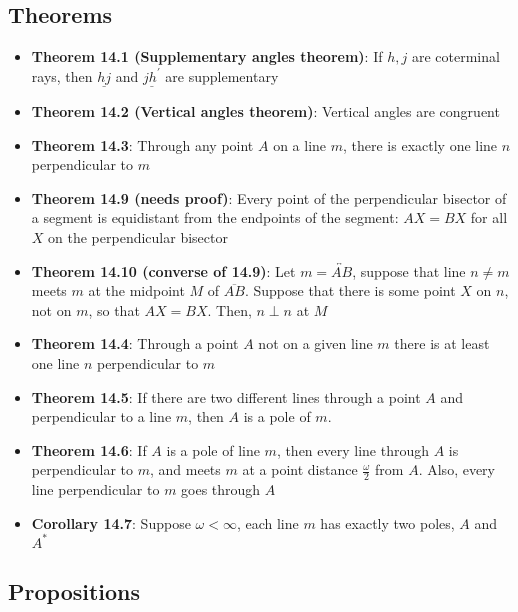 \documentclass{report}
\begin{document}
    \pagebreak 
    \subsection{Theorems}
    \begin{itemize}
        \item \textbf{Theorem 14.1 (Supplementary angles theorem)}: If $h,j$ are coterminal rays, then $\underline{hj}$ and $\underline{jh^{\prime}} $ are supplementary
        \item \textbf{Theorem 14.2 (Vertical angles theorem)}: Vertical angles are congruent
        \item \textbf{Theorem 14.3}: Through any point $A$ on a line $m$, there is exactly one line $n$ perpendicular to $m$
        \item \textbf{Theorem 14.9 (needs proof)}: Every point of the perpendicular bisector of a segment is equidistant from the endpoints of the segment: $AX = BX$ for all $X$ on the perpendicular bisector
        \item \textbf{Theorem 14.10 (converse of 14.9)}: Let $m = \overleftrightarrow{AB}$, suppose that line $n\ne m$ meets $m$ at the midpoint $M$ of $\overline{AB}$. Suppose that there is some point $X$ on $n$, not on $m$, so that $AX = BX$. Then, $n \perp n$ at $M$
        \item \textbf{Theorem 14.4}: Through a point $A$ not on a given line $m$ there is at least one line $n$ perpendicular to $m$
        \item \textbf{Theorem 14.5}: If there are two different lines through a point $A$ and perpendicular to a line $m$, then $A$ is a pole of $m$.
        \item \textbf{Theorem 14.6}: If $A$ is a pole of line $m$, then every line through $A$ is perpendicular to $m$, and meets $m$ at a point distance $\frac{\omega}{2} $ from $A$. Also, every line perpendicular to $m$ goes through $A$
        \item \textbf{Corollary 14.7}: Suppose $\omega < \infty$, each line $m$ has exactly two poles, $A$ and $A^{*}$
    \end{itemize}

    \pagebreak 
    \subsection{Propositions}
    \begin{itemize}
        
    \end{itemize}
\end{document}
